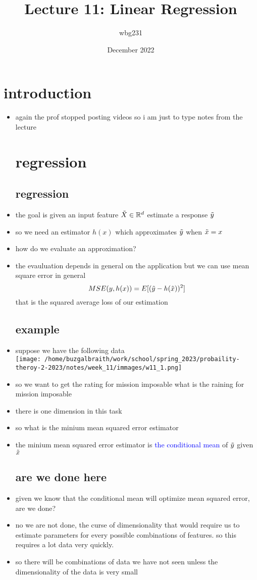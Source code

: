 \documentclass{article}
\title{Lecture 11: Linear Regression}
\author{wbg231 }
\date{December 2022}
\begin{document}
\maketitle

\section{introduction}
\begin{itemize}
\item again the prof stopped posting videos so i am just 
to type notes from the lecture 
\section{regression}
\subsection*{regression}
\item the goal is given an input feature $\Tilde{X}\in\mathbb{R}^d$ estimate a response
$\Tilde{y}$
\item so we need an estimator $h(x)$ which approximates $\Tilde{y}$ when $\Tilde{x}=x$
\item how do we evaluate an approximation?
\item the evauluation depends in general on the application but we can use mean square error 
in general 
$$MSE(y,h(x))=E[(\Tilde{y}-h(\Tilde{x}))^2]$$ that is the squared average loss of our estimation
\subsection*{example}
\item suppose we have the following data \\\texttt{[image: /home/buzgalbraith/work/school/spring\_2023/probaility-theroy-2-2023/notes/week\_11/immages/w11\_1.png]}
\item so we want to get the rating for mission imposable what is the raining for mission imposable
\item there is one dimension in this task 
\item so what is the minium mean squared error estimator 
\item the minium mean squared error  estimator is \textcolor{blue}{the conditional mean} of $\Tilde{y}$ given $\Tilde{x}$
\subsection*{are we done here}
\item given we know that the conditional mean will optimize mean squared error, are we done?
\item no we are not done, the curse of dimensionality that would require us to estimate parameters for every possible
combinations of features. so this requires a lot data very quickly. 
\item so there will be combinations of data we have not seen unless the dimensionality of the data is very small 

\end{itemize}
\end{document}
